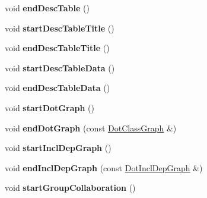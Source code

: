 \begin{DoxyCompactItemize}
\item 
\hypertarget{class_r_t_f_generator_aea3e3db6190b6ec4e0f5c3988cacb40c}{void {\bfseries end\-Desc\-Table} ()}\label{class_r_t_f_generator_aea3e3db6190b6ec4e0f5c3988cacb40c}

\item 
\hypertarget{class_r_t_f_generator_a5ab1218802d388186a056cba7ea439e2}{void {\bfseries start\-Desc\-Table\-Title} ()}\label{class_r_t_f_generator_a5ab1218802d388186a056cba7ea439e2}

\item 
\hypertarget{class_r_t_f_generator_a25c810f32509fa5a79d86d96a3d4a275}{void {\bfseries end\-Desc\-Table\-Title} ()}\label{class_r_t_f_generator_a25c810f32509fa5a79d86d96a3d4a275}

\item 
\hypertarget{class_r_t_f_generator_ade74ab43d9c69e30b4344e7d176bd07e}{void {\bfseries start\-Desc\-Table\-Data} ()}\label{class_r_t_f_generator_ade74ab43d9c69e30b4344e7d176bd07e}

\item 
\hypertarget{class_r_t_f_generator_aba60999e7c19eb5c546be43e157de98d}{void {\bfseries end\-Desc\-Table\-Data} ()}\label{class_r_t_f_generator_aba60999e7c19eb5c546be43e157de98d}

\item 
\hypertarget{class_r_t_f_generator_a3ea98cf1d0374587532fd534eb207de3}{void {\bfseries start\-Dot\-Graph} ()}\label{class_r_t_f_generator_a3ea98cf1d0374587532fd534eb207de3}

\item 
\hypertarget{class_r_t_f_generator_abb7b25f84e637dfb1f2e6aa48ed261ad}{void {\bfseries end\-Dot\-Graph} (const \hyperlink{class_dot_class_graph}{Dot\-Class\-Graph} \&)}\label{class_r_t_f_generator_abb7b25f84e637dfb1f2e6aa48ed261ad}

\item 
\hypertarget{class_r_t_f_generator_a94461be722782868a8ecb74a7fe44a35}{void {\bfseries start\-Incl\-Dep\-Graph} ()}\label{class_r_t_f_generator_a94461be722782868a8ecb74a7fe44a35}

\item 
\hypertarget{class_r_t_f_generator_ac5b96f27fcdca2efe79600038e10cfc4}{void {\bfseries end\-Incl\-Dep\-Graph} (const \hyperlink{class_dot_incl_dep_graph}{Dot\-Incl\-Dep\-Graph} \&)}\label{class_r_t_f_generator_ac5b96f27fcdca2efe79600038e10cfc4}

\item 
\hypertarget{class_r_t_f_generator_ac75e421f535cd69ad8b286bb5682f98a}{void {\bfseries start\-Group\-Collaboration} ()}\label{class_r_t_f_generator_ac75e421f535cd69ad8b286bb5682f98a}


\end{DoxyCompactItemize}
